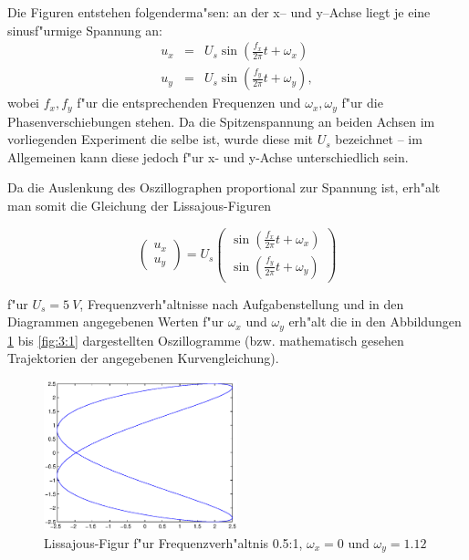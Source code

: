 \documentclass[10pt]{scrartcl}
\begin{document}
Die Figuren entstehen folgenderma"sen: an der x-- und y--Achse liegt je eine sinusf"urmige Spannung an:
\begin{eqnarray*}
u_x & = & U_s \sin (\frac{f_x}{2 \pi} t+\omega_x) \\
u_y & = & U_s \sin (\frac{f_y}{2 \pi} t+\omega_y),
\end{eqnarray*}
wobei $f_x, f_y$ f"ur die entsprechenden Frequenzen und $\omega_x, \omega_y$ f"ur die Phasenverschiebungen stehen. Da die Spitzenspannung an beiden Achsen im vorliegenden Experiment die selbe ist, wurde diese mit $U_s$ bezeichnet -- im Allgemeinen kann diese jedoch f"ur x- und y-Achse unterschiedlich sein.

Da die Auslenkung des Oszillographen proportional zur Spannung ist, erh"alt man somit die Gleichung der Lissajous-Figuren

\begin{displaymath}
\left(
\begin{array}{c}
u_x \\ u_y
\end{array} \right) = U_s
\left(
\begin{array}{c}
\sin (\frac{f_x}{2 \pi} t+\omega_x) \\ \sin (\frac{f_y}{2 \pi} t+\omega_y)
\end{array}
\right)
\end{displaymath}

f"ur $U_s=5~V$, Frequenzverh"altnisse nach Aufgabenstellung und in den Diagrammen angegebenen Werten f"ur $\omega_x$ und $\omega_y$ erh"alt die in den Abbildungen \ref{fig:0.5:1} bis \ref{fig:3:1} dargestellten Oszillogramme (bzw. mathematisch gesehen Trajektorien der angegebenen Kurvengleichung).

\begin{figure}
\includegraphics[width=0.5\textwidth]{05-1.eps}
\caption{Lissajous-Figur f"ur Frequenzverh"altnis 0.5:1, $\omega_x=0$ und $\omega_y=1.12$}
\label{fig:0.5:1}
\end{figure}
\end{document}
